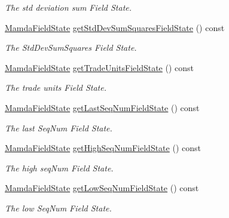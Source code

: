 \begin{CompactItemize}
\begin{CompactList}\small\item\em The std deviation sum Field State. \item\end{CompactList}\item 
\hyperlink{namespaceWombat_93aac974f2ab713554fd12a1fa3b7d2a}{Mamda\-Field\-State} \hyperlink{classWombat_1_1MamdaTradeListener_b14aa9b55ac04672085cd7135cb5868c}{get\-Std\-Dev\-Sum\-Squares\-Field\-State} () const 
\begin{CompactList}\small\item\em The Std\-Dev\-Sum\-Squares Field State. \item\end{CompactList}\item 
\hyperlink{namespaceWombat_93aac974f2ab713554fd12a1fa3b7d2a}{Mamda\-Field\-State} \hyperlink{classWombat_1_1MamdaTradeListener_9c8d5e8e3f9aca07499877ea4b27c765}{get\-Trade\-Units\-Field\-State} () const 
\begin{CompactList}\small\item\em The trade units Field State. \item\end{CompactList}\item 
\hyperlink{namespaceWombat_93aac974f2ab713554fd12a1fa3b7d2a}{Mamda\-Field\-State} \hyperlink{classWombat_1_1MamdaTradeListener_3bd3e58f99dcb1456e393d3c204a8ce9}{get\-Last\-Seq\-Num\-Field\-State} () const 
\begin{CompactList}\small\item\em The last Seq\-Num Field State. \item\end{CompactList}\item 
\hyperlink{namespaceWombat_93aac974f2ab713554fd12a1fa3b7d2a}{Mamda\-Field\-State} \hyperlink{classWombat_1_1MamdaTradeListener_50fb169b697c0c3d26516b13f864db80}{get\-High\-Seq\-Num\-Field\-State} () const 
\begin{CompactList}\small\item\em The high seq\-Num Field State. \item\end{CompactList}\item 
\hyperlink{namespaceWombat_93aac974f2ab713554fd12a1fa3b7d2a}{Mamda\-Field\-State} \hyperlink{classWombat_1_1MamdaTradeListener_61a7251329f3b6425a917dc2f95a8759}{get\-Low\-Seq\-Num\-Field\-State} () const 
\begin{CompactList}\small\item\em The low Seq\-Num Field State. \item\end{CompactList}\item 

\end{CompactItemize}
